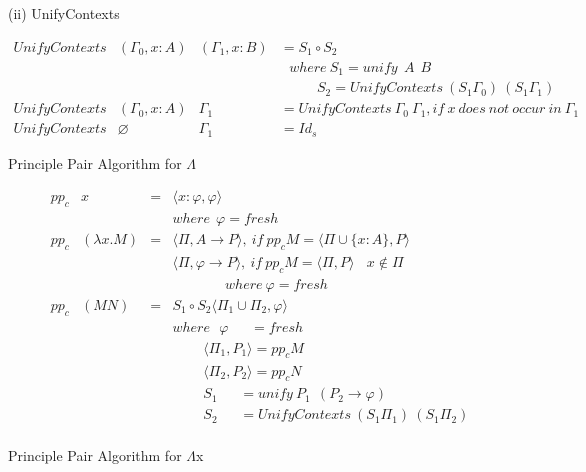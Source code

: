 \noindent (ii) UnifyContexts

\begin{equation*}
\begin{array}{llll}
UnifyContexts & (\Gamma _0,x:A) & (\Gamma _1,x:B) & = S_1\circ S_2\\
&&&\ \ \ where\ S_1 = unify\ \ A\ \ B\\
&&&\ \ \ \ \ \ \ \ \ \ \ \ S_2 = UnifyContexts\ (S_1\Gamma _0)\ (S_1\Gamma _1)\\
UnifyContexts & (\Gamma _0,x:A) & \Gamma _1 & = UnifyContexts\ \Gamma _0\ \Gamma _1, if\ x\ does\ not\ occur\ in\ \Gamma _1\\
UnifyContexts & \varnothing & \Gamma _1 & =  Id_s
\end{array}
\end{equation*}



\begin{def1}{\label{def:ppc}}
\normalfont  Principle  Pair  Algorithm  for  $\Lambda$
\end{def1}

\begin{equation*}
\begin{array}{llll}
pp_c & x & = & \langle x:\varphi,\varphi \rangle\\
&&& where\ \ \varphi=fresh\\
pp_c & (\lambda x.M) & = & \langle \Pi,A \rightarrow P \rangle,\ if\ pp_cM=\langle \Pi \cup \{x:A\},P \rangle\\
&&& \langle \Pi,\varphi \rightarrow P \rangle,\ if\ pp_cM=\langle \Pi ,P \rangle\ \ \ \ x\not\in \Pi\\
&&&\ \ \ \ \ \ \ \ \ \ \ \ \ \ \ \ \ where\ \varphi=fresh\\
pp_c & (MN) & = & S_1\circ S_2\langle \Pi _1\cup \Pi _2,\varphi \rangle\\
&&& where\ \ \ \varphi \ \ \ \ \ \ \ = fresh\\
&&& \ \ \ \ \ \ \ \ \ \ \langle \Pi _1,P_1\rangle = pp_cM\\
&&& \ \ \ \ \ \ \ \ \ \ \langle \Pi _2,P_2\rangle = pp_cN\\
&&& \ \ \ \ \ \ \ \ \ \ S_1 \ \ \ \ \ \ \ = unify\ P_1\ \ (P_2 \rightarrow \varphi)\\
&&& \ \ \ \ \ \ \ \ \ \ S_2 \ \ \ \ \ \ \ = UnifyContexts\ (S_1\Pi _1)\ (S_1\Pi _2)\\
\end{array}
\end{equation*}


\begin{def1}{\label{def:ppcxgc}}
\normalfont  Principle  Pair  Algorithm  for  $\Lambda$x
\end{def1}

